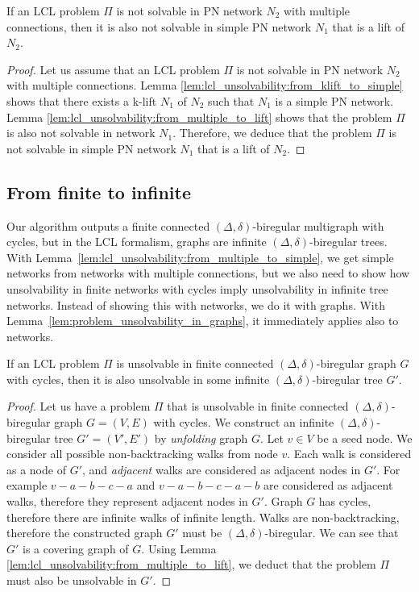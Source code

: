 \begin{lemma} \label{lem:lcl_unsolvability:from_multiple_to_simple}
    If an LCL problem $\Pi$ is not solvable in PN network $N_2$ with multiple connections, then it is also not solvable in simple PN network $N_1$ that is a lift of $N_2$.
\end{lemma}
\begin{proof}
    Let us assume that an LCL problem $\Pi$ is not solvable in PN network $N_2$ with multiple connections.
    Lemma \ref{lem:lcl_unsolvability:from_klift_to_simple} shows that there exists a k-lift $N_1$ of $N_2$ such that $N_1$ is a simple PN network.
    Lemma \ref{lem:lcl_unsolvability:from_multiple_to_lift} shows that the problem $\Pi$ is also not solvable in network $N_1$.
    Therefore, we deduce that the problem $\Pi$ is not solvable in simple PN network $N_1$ that is a lift of $N_2$.
\end{proof}


\subsection{From finite to infinite} \label{sec:algorithm:from_finite_to_infinite}
Our algorithm outputs a finite connected $(\Delta, \delta)$-biregular multigraph with cycles, but in the LCL formalism, graphs are infinite $(\Delta, \delta)$-biregular trees.
With Lemma~\ref{lem:lcl_unsolvability:from_multiple_to_simple}, we get simple networks from networks with multiple connections, but we also need to show how unsolvability in finite networks with cycles imply unsolvability in infinite tree networks.
Instead of showing this with networks, we do it with graphs.
With Lemma~\ref{lem:problem_unsolvability_in_graphs}, it immediately applies also to networks.

\begin{lemma} \label{lem:from_finite_to_infinite}
    If an LCL problem $\Pi$ is unsolvable in finite connected $(\Delta, \delta)$-biregular graph $G$ with cycles, then it is also unsolvable in some infinite $(\Delta, \delta)$-biregular tree $G'$.
\end{lemma}
\begin{proof}
    Let us have a problem $\Pi$ that is unsolvable in finite connected $(\Delta, \delta)$-biregular graph $G=(V, E)$ with cycles.
    We construct an infinite $(\Delta, \delta)$-biregular tree $G'=(V', E')$ by \emph{unfolding} graph $G$.
    Let $v \in V$ be a seed node.
    We consider all possible non-backtracking walks from node $v$.
    Each walk is considered as a node of $G'$, and \emph{adjacent} walks are considered as adjacent nodes in $G'$.
    For example $v-a-b-c-a$ and $v-a-b-c-a-b$ are considered as adjacent walks, therefore they represent adjacent nodes in $G'$.
    Graph $G$ has cycles, therefore there are infinite walks of infinite length.
    Walks are non-backtracking, therefore the constructed graph $G'$ must be $(\Delta, \delta)$-biregular.
    We can see that $G'$ is a covering graph of $G$.
    Using Lemma \ref{lem:lcl_unsolvability:from_multiple_to_lift}, we deduct that the problem $\Pi$ must also be unsolvable in $G'$.
\end{proof}

